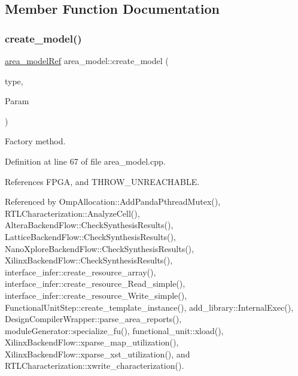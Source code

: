 \subsection{Member Function Documentation}
\mbox{\label{classarea__model_a3babf6a1d22f03e4ee955134f3d87d73}} 
\subsubsection{\texorpdfstring{create\+\_\+model()}{create\_model()}}
{\footnotesize\ttfamily \hyperlink{area__model_8hpp_aec11e4e9b1b3afd49a437cb37df0abfb}{area\+\_\+model\+Ref} area\+\_\+model\+::create\+\_\+model (\begin{DoxyParamCaption}\item[{const \hyperlink{target__device_8hpp_a476becc690220f0805ce73006449c732}{Target\+Device\+\_\+\+Type}}]{type,  }\item[{const \hyperlink{Parameter_8hpp_a37841774a6fcb479b597fdf8955eb4ea}{Parameter\+Const\+Ref} \&}]{Param }\end{DoxyParamCaption})\hspace{0.3cm}{\ttfamily [static]}}



Factory method. 



Definition at line 67 of file area\+\_\+model.\+cpp.



References F\+P\+GA, and T\+H\+R\+O\+W\+\_\+\+U\+N\+R\+E\+A\+C\+H\+A\+B\+LE.



Referenced by Omp\+Allocation\+::\+Add\+Panda\+Pthread\+Mutex(), R\+T\+L\+Characterization\+::\+Analyze\+Cell(), Altera\+Backend\+Flow\+::\+Check\+Synthesis\+Results(), Lattice\+Backend\+Flow\+::\+Check\+Synthesis\+Results(), Nano\+Xplore\+Backend\+Flow\+::\+Check\+Synthesis\+Results(), Xilinx\+Backend\+Flow\+::\+Check\+Synthesis\+Results(), interface\+\_\+infer\+::create\+\_\+resource\+\_\+array(), interface\+\_\+infer\+::create\+\_\+resource\+\_\+\+Read\+\_\+simple(), interface\+\_\+infer\+::create\+\_\+resource\+\_\+\+Write\+\_\+simple(), Functional\+Unit\+Step\+::create\+\_\+template\+\_\+instance(), add\+\_\+library\+::\+Internal\+Exec(), Design\+Compiler\+Wrapper\+::parse\+\_\+area\+\_\+reports(), module\+Generator\+::specialize\+\_\+fu(), functional\+\_\+unit\+::xload(), Xilinx\+Backend\+Flow\+::xparse\+\_\+map\+\_\+utilization(), Xilinx\+Backend\+Flow\+::xparse\+\_\+xst\+\_\+utilization(), and R\+T\+L\+Characterization\+::xwrite\+\_\+characterization().


